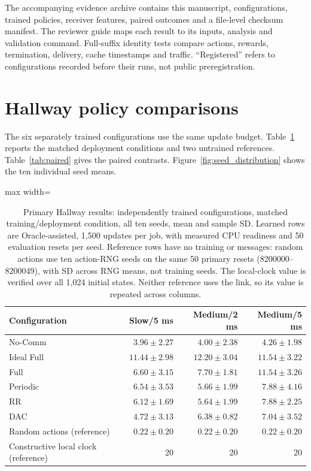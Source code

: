 \documentclass[11pt,a4paper]{article}
\begin{document}
The accompanying evidence archive contains this manuscript, configurations, trained policies, receiver features, paired outcomes and a file-level checksum manifest. The reviewer guide maps each result to its inputs, analysis and validation command. Full-suffix identity tests compare actions, rewards, termination, delivery, cache timestamps and traffic. ``Registered'' refers to configurations recorded before their runs, not public preregistration.
\FloatBarrier
\section{Hallway policy comparisons}
The six separately trained configurations use the same update budget. Table~\ref{tab:primary} reports the matched deployment conditions and two untrained references. Table~\ref{tab:paired} gives the paired contrasts. Figure~\ref{fig:seed_distribution} shows the ten individual seed means.
\begin{table}[htbp]\centering\setlength{\tabcolsep}{3pt}\small
\caption{Primary Hallway results: independently trained configurations, matched training/deployment condition, all ten seeds, mean and sample SD. Learned rows are Oracle-assisted, 1,500 updates per job, with measured CPU readiness and 50 evaluation resets per seed. Reference rows have no training or messages: random actions use ten action-RNG seeds on the same 50 primary resets (8200000--8200049), with SD across RNG means, not training seeds. The local-clock value is verified over all 1,024 initial states. Neither reference uses the link, so its value is repeated across columns.}\label{tab:primary}
\vspace{2.5mm}
\begin{adjustbox}{max width=\linewidth}\begin{tabular}{lrrr}\toprule
Configuration & Slow/5 ms & Medium/2 ms & Medium/5 ms\\\midrule
No-Comm & $3.96\pm2.27$ & $4.00\pm2.38$ & $4.26\pm1.98$\\
Ideal Full & $11.44\pm2.98$ & $12.20\pm3.04$ & $11.54\pm3.22$\\
Full & $6.60\pm3.15$ & $7.70\pm1.81$ & $11.54\pm3.26$\\
Periodic & $6.54\pm3.53$ & $5.66\pm1.99$ & $7.88\pm4.16$\\
RR & $6.12\pm1.69$ & $5.64\pm1.99$ & $7.88\pm2.25$\\
DAC & $4.72\pm3.13$ & $6.38\pm0.82$ & $7.04\pm3.52$\\
\midrule Random actions (reference) & $0.22\pm0.20$ & $0.22\pm0.20$ & $0.22\pm0.20$\\
Constructive local clock (reference) & 20 & 20 & 20\\
\bottomrule\end{tabular}\end{adjustbox}\end{table}
\end{document}
